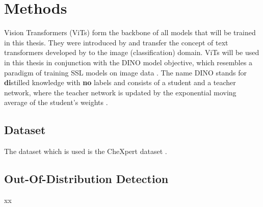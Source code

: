 \section{Methods}
Vision Transformers (ViTs) form the backbone of all models that will be trained in this thesis.
They were introduced by \citep{Dosovitskiy2020} and transfer the concept of text transformers developed by \citep{Vaswani2017} to the image (classification) domain.
ViTs will be used in this thesis in conjunction with the DINO model objective, which resembles a paradigm of training SSL models on image data \citep{Caron2021}.
The name DINO stands for \textbf{di}stilled knowledge with \textbf{no} labels and consists of a student and a teacher network, where the teacher network is updated by the exponential moving average of the student's weights \citep{Caron2021}.

\subsection{Dataset}
The dataset which is used is the CheXpert dataset \citep{Irvin2019}.

\subsection{Out-Of-Distribution Detection}
xx

